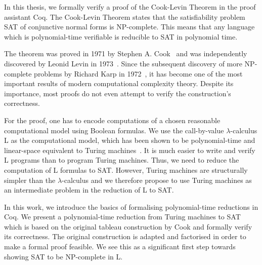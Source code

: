 In this thesis, we formally verify a proof of the Cook-Levin Theorem in the proof assistant Coq.
The Cook-Levin Theorem states that the satisfiability problem SAT of conjunctive normal forms is NP-complete. 
This means that any language which is polynomial-time verifiable is reducible to SAT in polynomial time. 

The theorem was proved in 1971 by Stephen A. Cook~\cite{cook_theorem} and was independently discovered by Leonid Levin in 1973~\cite{levin_theorem}.
Since the subsequent discovery of more NP-complete problems by Richard Karp in 1972~\cite{Karp1972}, it has become one of the most important results of modern computational complexity theory.
Despite its importance, most proofs do not even attempt to verify the construction's correctness.

For the proof, one has to encode computations of a chosen reasonable computational model using Boolean formulas. 
We use the call-by-value $\lambda$-calculus L as the computational model, which has been shown to be polynomial-time and linear-space equivalent to Turing machines~\cite{ForsterKunzeRoth:2019:wcbv-Reasonable}. It is much easier to write and verify L programs than to program Turing machines.
Thus, we need to reduce the computation of L formulas to SAT.
However, Turing machines are structurally simpler than the $\lambda$-calculus and we therefore propose to use Turing machines as an intermediate problem in the reduction of L to SAT.


In this work, we introduce the basics of formalising polynomial-time reductions in Coq. We present a polynomial-time reduction from Turing machines to SAT which is based on the original tableau construction by Cook and formally verify its correctness. The original construction is adapted and factorised in order to make a formal proof feasible. We see this as a significant first step towards showing SAT to be NP-complete in L.

